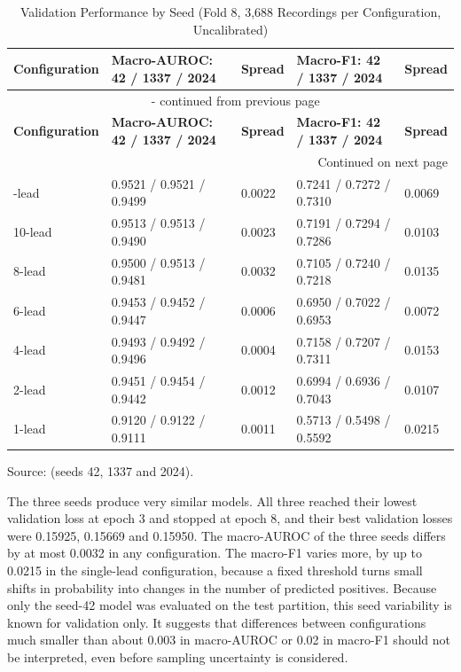 {\scriptsize
\setlength{\tabcolsep}{2pt}
\renewcommand{\arraystretch}{1.12}
\setlength{\LTcapwidth}{\textwidth}
\begin{longtable}{|p{}|p{}|p{}|p{}|p{}|}
\caption[Validation Performance by Seed]{Validation Performance by Seed (Fold 8, 3,688 Recordings per Configuration, Uncalibrated)}\label{tab:ch4_6}\\
\hline
\textbf{Configuration} & \textbf{Macro-AUROC: 42 / 1337 / 2024} & \textbf{Spread} & \textbf{Macro-F1: 42 / 1337 / 2024} & \textbf{Spread} \\ \hline
\endfirsthead
\multicolumn{5}{c}{\tablename~\thetable{} - continued from previous page} \\ \hline
\textbf{Configuration} & \textbf{Macro-AUROC: 42 / 1337 / 2024} & \textbf{Spread} & \textbf{Macro-F1: 42 / 1337 / 2024} & \textbf{Spread} \\ \hline
\endhead
\hline
\multicolumn{5}{r}{Continued on next page} \\
\endfoot
\hline
\endlastfoot
12-lead & 0.9521 / 0.9521 / 0.9499 & 0.0022 & 0.7241 / 0.7272 / 0.7310 & 0.0069 \\ \hline
10-lead & 0.9513 / 0.9513 / 0.9490 & 0.0023 & 0.7191 / 0.7294 / 0.7286 & 0.0103 \\ \hline
8-lead & 0.9500 / 0.9513 / 0.9481 & 0.0032 & 0.7105 / 0.7240 / 0.7218 & 0.0135 \\ \hline
6-lead & 0.9453 / 0.9452 / 0.9447 & 0.0006 & 0.6950 / 0.7022 / 0.6953 & 0.0072 \\ \hline
4-lead & 0.9493 / 0.9492 / 0.9496 & 0.0004 & 0.7158 / 0.7207 / 0.7311 & 0.0153 \\ \hline
2-lead & 0.9451 / 0.9454 / 0.9442 & 0.0012 & 0.6994 / 0.6936 / 0.7043 & 0.0107 \\ \hline
1-lead & 0.9120 / 0.9122 / 0.9111 & 0.0011 & 0.5713 / 0.5498 / 0.5592 & 0.0215 \\ \hline
\end{longtable}
}

{\small Source:  (seeds 42, 1337 and 2024).}

The three seeds produce very similar models. All three reached their lowest validation loss at epoch 3 and stopped at epoch 8, and their best validation losses were 0.15925, 0.15669 and 0.15950. The macro-AUROC of the three seeds differs by at most 0.0032 in any configuration. The macro-F1 varies more, by up to 0.0215 in the single-lead configuration, because a fixed threshold turns small shifts in probability into changes in the number of predicted positives. Because only the seed-42 model was evaluated on the test partition, this seed variability is known for validation only. It suggests that differences between configurations much smaller than about 0.003 in macro-AUROC or 0.02 in macro-F1 should not be interpreted, even before sampling uncertainty is considered.

